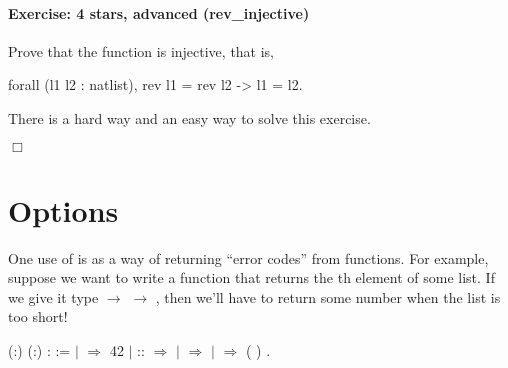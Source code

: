 \documentclass[12pt]{report}
\begin{document}
\paragraph{Exercise: 4 stars, advanced (rev\_injective)}

 Prove that the  function is injective, that is,


    forall (l1 l2 : natlist), rev l1 = rev l2 -> l1 = l2.


There is a hard way and an easy way to solve this exercise.
\begin{coqdoccode}
\coqdocemptyline
\end{coqdoccode}
\ensuremath{\Box} \begin{coqdoccode}
\coqdocemptyline
\end{coqdoccode}
\section{Options}



 One use of  is as a way of returning ``error
    codes'' from functions.  For example, suppose we want to write a
    function that returns the th element of some list.  If we give
    it type  \ensuremath{\rightarrow}  \ensuremath{\rightarrow} , then we'll have to return some
    number when the list is too short! \begin{coqdoccode}
\coqdocemptyline
\coqdocnoindent
{}  (:) (:) :  :=\coqdoceol
\coqdocindent{1.00em}
  \coqdoceol
\coqdocindent{1.00em}
\ensuremath{|}  \ensuremath{\Rightarrow} 42  \coqdoceol
\coqdocindent{1.00em}
\ensuremath{|}  ::  \ensuremath{\Rightarrow}      \coqdoceol
\coqdocindent{7.50em}
\ensuremath{|}  \ensuremath{\Rightarrow}  \coqdoceol
\coqdocindent{7.50em}
\ensuremath{|}  \ensuremath{\Rightarrow}  ( )  \coqdoceol
\coqdocindent{7.50em}
\coqdoceol
\coqdocindent{1.00em}
.\coqdoceol
\coqdocemptyline
\end{coqdoccode}
\subsubsection{ }
\end{document}
